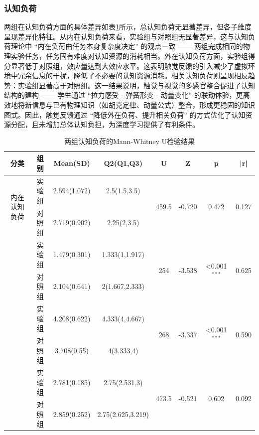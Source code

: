 \documentclass[runningheads]{llncs}
\begin{document}
\subsubsection{认知负荷}
两组在认知负荷方面的具体差异如表\ref{tab:cognitive-load}所示，总认知负荷无显著差异，但各子维度呈现差异化特征。从内在认知负荷来看，实验组与对照组无显著差异，这与认知负荷理论中 “内在负荷由任务本身复杂度决定” 的观点一致 —— 两组完成相同的物理实验任务，任务固有难度对认知资源的消耗相当。外在认知负荷方面，实验组得分显著低于对照组，效应量达到大效应水平。这表明触觉反馈的引入减少了虚拟环境中冗余信息的干扰，降低了不必要的认知资源消耗。相关认知负荷则呈现相反趋势：实验组显著高于对照组。这一结果说明，触觉与视觉的多感官整合促进了认知结构的建构 —— 学生通过 “拉力感受 - 弹簧形变 - 动量变化” 的联动体验，更高效地将新信息与已有物理知识（如胡克定律、动量公式）整合，形成更稳固的知识图式。因此，触觉反馈通过 “降低外在负荷、提升相关负荷” 的方式优化了认知资源分配，且未增加总体认知负担，为深度学习提供了有利条件。

\begin{table}[t]
\centering
\setlength{\tabcolsep}{2pt} %
\caption{两组认知负荷的Mann-Whitney U检验结果}
\label{tab:cognitive-load}
\begin{tabular}{cccccccc}
\toprule
\textbf{分类} & \textbf{组别} & \textbf{Mean(SD)} & \textbf{Q2(Q1,Q3)} & \textbf{U} & \textbf{Z} & \textbf{p} & \textbf{|r|} \\
\midrule
\multirow{2}{*}{内在认知负荷} 
& 实验组 & 2.594(1.072) & 2.5(1.5,3.5) & \multirow{2}{*}{459.5} & \multirow{2}{*}{-0.720} & \multirow{2}{*}{0.472} & \multirow{2}{*}{0.127} \\
& 对照组 & 2.719(0.902) & 2.25(2,3.5) \\
\addlinespace
\multirow{2}{*}{外在认知负荷} 
& 实验组 & 1.479(0.301) & 1.333(1,1.917) & \multirow{2}{*}{254} & \multirow{2}{*}{-3.538} & \multirow{2}{*}{<0.001\(^{***}\)} & \multirow{2}{*}{0.625} \\
& 对照组 & 2.104(0.641) & 2(1.667,2.333) \\
\addlinespace
\multirow{2}{*}{相关认知负荷} 
& 实验组 & 4.208(0.622) & 4.333(4,4.667) & \multirow{2}{*}{268} & \multirow{2}{*}{-3.337} & \multirow{2}{*}{<0.001\(^{***}\)} & \multirow{2}{*}{0.590} \\
& 对照组 & 3.708(0.55) & 4(3.333,4) \\
\addlinespace
\multirow{2}{*}{总认知负荷} 
& 实验组 & 2.781(0.185) & 2.75(2.531,3) & \multirow{2}{*}{473.5} & \multirow{2}{*}{-0.521} & \multirow{2}{*}{0.602} & \multirow{2}{*}{0.092} \\
& 对照组 & 2.859(0.252) & 2.75(2.625,3.219) \\
\bottomrule
\end{tabular}
\end{table}
\end{document}
